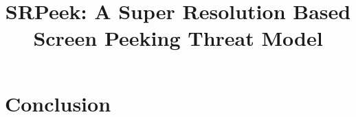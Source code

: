\documentclass[10pt, conference, letterpaper]{IEEEtran}
\begin{document}
\title{SRPeek: A Super Resolution Based Screen Peeking Threat Model}




\maketitle















\section{Conclusion}
\label{sec-conclusion}





\end{document}
